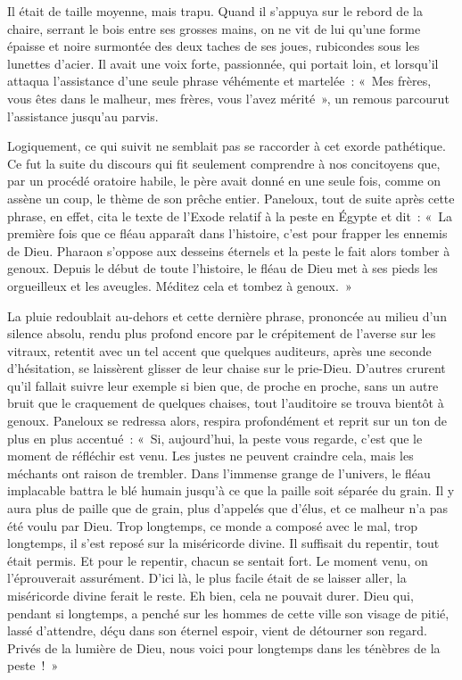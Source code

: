 \documentclass[french,twoside]{book} %
\begin{document}
Il était de taille moyenne, mais trapu. Quand il s’appuya sur le rebord de la chaire, serrant le bois entre ses grosses mains, on ne vit de lui qu’une forme épaisse et noire surmontée des deux taches de ses joues, rubicondes sous les lunettes d’acier. Il avait une voix forte, passionnée, qui portait loin, et lorsqu’il attaqua l’assistance d’une seule phrase véhémente et martelée : « Mes frères, vous êtes dans le malheur, mes frères, vous l’avez mérité », un remous parcourut l’assistance jusqu’au parvis.\par
Logiquement, ce qui suivit ne semblait pas se raccorder à cet exorde pathétique. Ce fut la suite du discours qui fit seulement comprendre à nos concitoyens que, par un procédé oratoire habile, le père avait donné en une seule fois, comme on assène un coup, le thème de son prêche entier. Paneloux, tout de suite après cette phrase, en effet, cita le texte de l’Exode relatif à la peste en Égypte et dit : « La première fois que ce fléau apparaît dans l’histoire, c’est pour frapper les ennemis de Dieu. Pharaon s’oppose aux desseins éternels et la peste le fait alors tomber à genoux. Depuis le début de toute l’histoire, le fléau de Dieu met à ses pieds les orgueilleux et les aveugles. Méditez cela et tombez à genoux. »\par
La pluie redoublait au-dehors et cette dernière phrase, prononcée au milieu d’un silence absolu, rendu plus profond encore par le crépitement de l’averse sur les vitraux, retentit avec un tel accent que quelques auditeurs, après une seconde d’hésitation, se laissèrent glisser de leur chaise sur le prie-Dieu. D’autres crurent qu’il fallait suivre leur exemple si bien que, de proche en proche, sans un autre bruit que le craquement de quelques chaises, tout l’auditoire se trouva bientôt à genoux. Paneloux se redressa alors, respira profondément et reprit sur un ton de plus en plus accentué : « Si, aujourd’hui, la peste vous regarde, c’est que le moment de réfléchir est venu. Les justes ne peuvent craindre cela, mais les méchants ont raison de trembler. Dans l’immense grange de l’univers, le fléau implacable battra le blé humain jusqu’à ce que la paille soit séparée du grain. Il y aura plus de paille que de grain, plus d’appelés que d’élus, et ce malheur n’a pas été voulu par Dieu. Trop longtemps, ce monde a composé avec le mal, trop longtemps, il s’est reposé sur la miséricorde divine. Il suffisait du repentir, tout était permis. Et pour le repentir, chacun se sentait fort. Le moment venu, on l’éprouverait assurément. D’ici là, le plus facile était de se laisser aller, la miséricorde divine ferait le reste. Eh bien, cela ne pouvait durer. Dieu qui, pendant si longtemps, a penché sur les hommes de cette ville son visage de pitié, lassé d’attendre, déçu dans son éternel espoir, vient de détourner son regard. Privés de la lumière de Dieu, nous voici pour longtemps dans les ténèbres de la peste ! »\par
\end{document}
